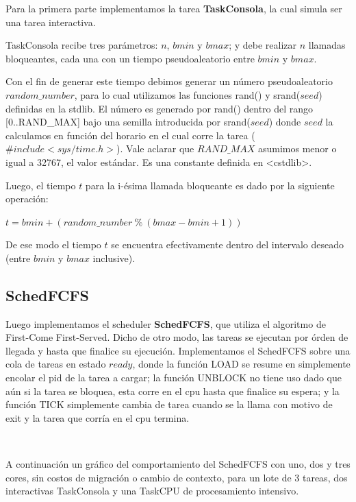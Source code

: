 Para la primera parte implementamos la tarea \textbf{TaskConsola}, la cual simula ser una tarea interactiva.

TaskConsola recibe tres parámetros: $n$, $bmin$ y $bmax$; y debe realizar $n$ llamadas bloqueantes, cada una con un tiempo pseudoaleatorio entre $bmin$ y $bmax$. 

Con el fin de generar este tiempo debimos generar un número pseudoaleatorio $random\_number$, para lo cual utilizamos las funciones rand() y srand($seed$) definidas en la stdlib. El número es generado por rand() dentro del rango [0..RAND\_MAX] bajo una semilla introducida por srand($seed$) donde $seed$ la calculamos en función del horario en el cual corre la tarea ($\#include <sys/time.h>$). Vale aclarar que $RAND\_MAX$ asumimos menor o igual a 32767, el valor estándar. Es una constante definida en <cstdlib>.

Luego, el tiempo $t$ para la i-ésima llamada bloqueante es dado por la siguiente operación:

\begin{center}
	$t = bmin + (random\_number \ \% \ (bmax-bmin+1))$
\end{center}

%

De ese modo el tiempo $t$ se encuentra efectivamente dentro del intervalo deseado (entre $bmin$ y $bmax$ inclusive).

\subsection{SchedFCFS}

Luego implementamos el scheduler \textbf{SchedFCFS}, que utiliza el algoritmo de First-Come First-Served. Dicho de otro modo, las tareas se ejecutan por órden de llegada y hasta que finalice su ejecución. Implementamos el SchedFCFS sobre una cola de tareas en estado $ready$, donde la función LOAD se resume en simplemente encolar el pid de la tarea a cargar; la función UNBLOCK no tiene uso dado que aún si la tarea se bloquea, esta corre en el cpu hasta que finalice su espera; y la función TICK simplemente cambia de tarea cuando se la llama con motivo de exit y la tarea que corría en el cpu termina.

~

A continuación un gráfico del comportamiento del SchedFCFS con uno, dos y tres cores, sin costos de migración o cambio de contexto, para un lote de 3 tareas, dos interactivas TaskConsola y una TaskCPU de procesamiento intensivo.

